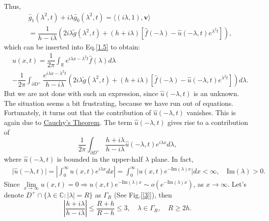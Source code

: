 \documentclass[12pt]{article}
\numberwithin{equation}{section}
\begin{document}
Thus,\begin{equation}\label{1.11}
    \begin{split}
    &\tilde{g_1}(\lambda^2,t)+i\lambda\tilde{g_0}(\lambda^2,t)=\langle (i\lambda,1),\boldsymbol{v}\rangle\\
    &=\dfrac{1}{h-i\lambda}\left(2i\lambda\tilde{g}(\lambda^2,t)+(h+i\lambda)[\hat{f}(-\lambda)-\hat{u}(-\lambda,t)e^{\lambda^2 t}]\right),
    \end{split}
\end{equation}
which can be inserted into Eq.\eqref{1.5} to obtain:
\begin{equation}\label{1.12}
    \begin{split}
        &u(x,t)=\dfrac{1}{2\pi}\int_{\mathbb{R}}e^{i\lambda x-\lambda^2 t}\hat{f}(\lambda)d\lambda\\
        &-\dfrac{1}{2\pi} \int_{\partial D^+} \dfrac{e^{i\lambda x-\lambda^2 t}}{h-i\lambda}\left(2i\lambda\tilde{g}(\lambda^2,t)+(h+i\lambda)[\hat{f}(-\lambda)-\hat{u}(-\lambda,t)e^{\lambda^2 t}]\right) d\lambda.
    \end{split}
\end{equation}\label{SSec 1.3}
But we are not done with such an expression, since $\hat{u}(-\lambda,t)$ is an unknown. The situation seems a bit frustrating, because we have run out of equations. 
Fortunately, it turns out that the contribution of $\hat{u}(-\lambda,t)$ vanishes. This is again due to \href{https://w.wiki/9aTM}{Cauchy's Theorem}.
The term $\hat{u}(-\lambda,t)$ gives rise to a contribution of 
\begin{equation*}
    \dfrac{1}{2\pi}\int_{\partial D^+}\dfrac{h+i\lambda}{h-i\lambda}\hat{u}(-\lambda,t)e^{i\lambda x}d\lambda,
\end{equation*}
where $\hat{u}(-\lambda,t)$ is bounded in the upper-half $\lambda$ plane. In fact,
\begin{equation*}
    \begin{split}
      &\vert\hat{u}(-\lambda,t)\vert=\left|\int_{0}^{\infty} u(x,t)e^{i\lambda x} dx\right|=\int_{0}^{\infty} \vert u(x,t)e^{-\text{Im}(\lambda)x}\vert dx<\infty,\quad \text{Im}(\lambda)> 0.
    \end{split}
\end{equation*}
Since $\lim\limits_{x\to\infty} u(x,t)=0\Rightarrow u(x,t)e^{-\text{Im}(\lambda)x}\sim o(e^{-\text{Im}(\lambda)x})$, as $x\to\infty$.
Let's denote $D^+\cap\{\lambda\in\mathbb{C}:\vert\lambda\vert=R\}$ as $\Gamma_{R}$ (See Fig.[\ref{3}]), then 
\begin{equation*}
    \left|\dfrac{h+i\lambda}{h-i\lambda}\right|\leqslant \dfrac{R+h}{R-h}\leqslant 3, \quad \lambda\in\Gamma_{R},\quad R\geqslant 2h.
\end{equation*}
\end{document}
